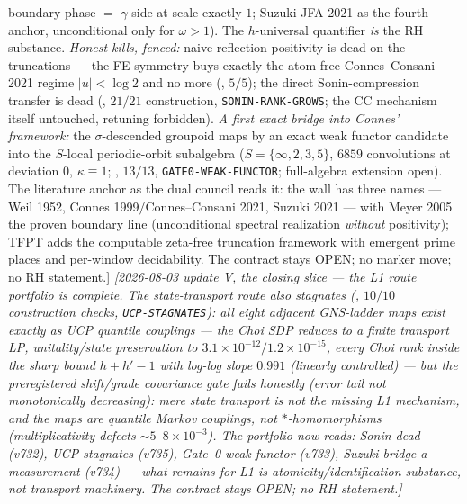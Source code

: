 \documentclass[11pt,a4paper]{article}
\begin{document}
{boundary phase $=$ $\gamma$-side at scale exactly $1$; Suzuki JFA
2021 as the fourth anchor, unconditional only for $\omega>1$).  The
$h$-universal quantifier \emph{is} the RH substance.  \emph{Honest
kills, fenced:} naive reflection positivity is dead on the
truncations --- the FE symmetry buys exactly the atom-free
Connes--Consani 2021 regime $|u|<\log2$ and no more
(, $5/5$); the direct
Sonin-compression transfer is dead
(, $21/21$ construction,
\texttt{SONIN-RANK-GROWS}; the CC mechanism itself untouched,
retuning forbidden).  \emph{A first exact bridge into Connes'
framework:} the $\sigma$-descended groupoid maps by an exact weak
functor candidate into the $S$-local periodic-orbit subalgebra
($S=\{\infty,2,3,5\}$, $6859$ convolutions at deviation $0$,
$\kappa\equiv1$; , $13/13$,
\texttt{GATE0-WEAK-FUNCTOR}; full-algebra extension open).  The
literature anchor as the dual council reads it: the wall has three
names --- Weil 1952, Connes 1999$/$Connes--Consani 2021, Suzuki
2021 --- with Meyer 2005 the proven boundary line (unconditional
spectral realization \emph{without} positivity); TFPT adds the
computable zeta-free truncation framework with emergent prime
places and per-window decidability.  The contract stays OPEN; no
marker move; no RH statement.]}
\emph{[2026-08-03 update V, the closing slice --- the L1 route
portfolio is complete.  The state-transport route also stagnates
(, $10/10$ construction
checks, \texttt{UCP-STAGNATES}): all eight adjacent GNS-ladder maps
exist \emph{exactly} as UCP quantile couplings --- the Choi SDP
reduces to a finite transport LP, unitality/state preservation to
$3.1\times10^{-12}/1.2\times10^{-15}$, every Choi rank inside the
sharp bound $h+h'-1$ with log-log slope $0.991$ (linearly
controlled) --- but the preregistered shift/grade covariance gate
fails honestly (error tail not monotonically decreasing): mere
state transport is \emph{not} the missing L1 mechanism, and the
maps are quantile Markov couplings, not $*$-homomorphisms
(multiplicativity defects ${\sim}5$--$8\times10^{-3}$).  The
portfolio now reads: Sonin dead (v732), UCP stagnates (v735),
Gate~0 weak functor (v733), Suzuki bridge a measurement (v734) ---
what remains for L1 is atomicity/identification substance, not
transport machinery.  The contract stays OPEN; no RH statement.]}
\end{document}
